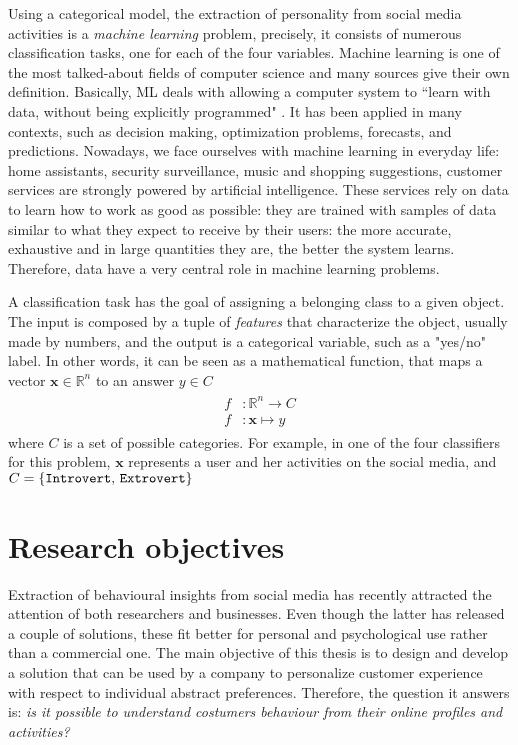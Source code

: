 Using a categorical model, the extraction of personality from social media activities is a \textit{machine learning} problem, precisely, it consists of numerous classification tasks, one for each of the four variables.
Machine learning is one of the most talked-about fields of computer science and many sources give their own definition. Basically, ML deals with allowing a computer system to ``learn with data, without being explicitly programmed" \cite{samuel1959some}.
It has been applied in many contexts, such as decision making, optimization problems, forecasts, and predictions.
Nowadays, we face ourselves with machine learning in everyday life: home assistants, security surveillance, music and shopping suggestions, customer services are strongly powered by artificial intelligence.
These services rely on data to learn how to work as good as possible: they are trained with samples of data similar to what they expect to receive by their users: the more accurate, exhaustive and in large quantities they are, the better the system learns. Therefore, data have a very central role in machine learning problems.

A classification task has the goal of assigning a belonging class to a given object. The input is composed by a tuple of \emph{features} that characterize the object, usually made by numbers, and the output is a categorical variable, such as a "yes/no" label. In other words, it can be seen as a mathematical function, that maps a vector $ \boldsymbol{x} \in \mathbb{R}^n $ to an answer $ y \in C $
\begin{gather*}
\begin{split}
f & \colon \mathbb{R}^n \to C \\
f & \colon \boldsymbol{x} \mapsto y
\end{split}
\end{gather*}
where $C$ is a set of possible categories.
For example, in one of the four classifiers for this problem, $ \boldsymbol{x} $ represents a user and her activities on the social media, and $C = \{\text{\texttt{Introvert}, \texttt{Extrovert}}\}$

\section{Research objectives}
Extraction of behavioural insights from social media has recently attracted the attention of both researchers and businesses.
Even though the latter has released a couple of solutions, these fit better for personal and psychological use rather than a commercial one.
The main objective of this thesis is to design and develop a solution that can be used by a company to personalize customer experience with respect to individual abstract preferences.
Therefore, the question it answers is: \textit{is it possible to understand costumers behaviour from their online profiles and activities?}

